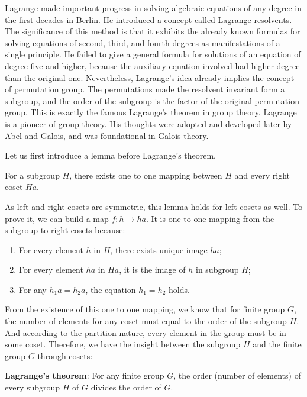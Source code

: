 \documentclass{article}
\begin{document}
Lagrange made important progress in solving algebraic equations of any degree in the first decades in Berlin. He introduced a concept called Lagrange resolvents. The significance of this method is that it exhibits the already known formulas for solving equations of second, third, and fourth degrees as manifestations of a single principle. He failed to give a general formula for solutions of an equation of degree five and higher, because the auxiliary equation involved had higher degree than the original one. Nevertheless, Lagrange's idea already implies the concept of permutation group. The permutations made the resolvent invariant form a subgroup, and the order of the subgroup is the factor of the original permutation group. This is exactly the famous Lagrange's theorem in group theory. Lagrange is a pioneer of group theory. His thoughts were adopted and developed later by Abel and Galois, and was foundational in Galois theory.

Let us first introduce a lemma before Lagrange's theorem.

\begin{lemma}
For a subgroup $H$, there exists one to one mapping between $H$ and every right coset $Ha$.
\end{lemma}

As left and right cosets are symmetric, this lemma holds for left cosets as well. To prove it, we can build a map $f: h \to ha$. It is one to one mapping from the subgroup to right cosets because:

\begin{enumerate}
\item For every element $h$ in $H$, there exists unique image $ha$;
\item For every element $ha$ in $Ha$, it is the image of $h$ in subgroup $H$;
\item For any $h_1a = h_2a$, the equation $h_1 = h_2$ holds.
\end{enumerate}

From the existence of this one to one mapping, we know that for finite group $G$, the number of elements for any coset must equal to the order of the subgroup $H$. And according to the partition nature, every element in the group must be in some coset. Therefore, we have the insight between the subgroup $H$ and the finite group $G$ through cosets:

\begin{theorem}
\textbf{Lagrange's theorem}: For any finite group $G$, the order (number of elements) of every subgroup $H$ of $G$ divides the order of $G$.
\end{theorem}
\end{document}
